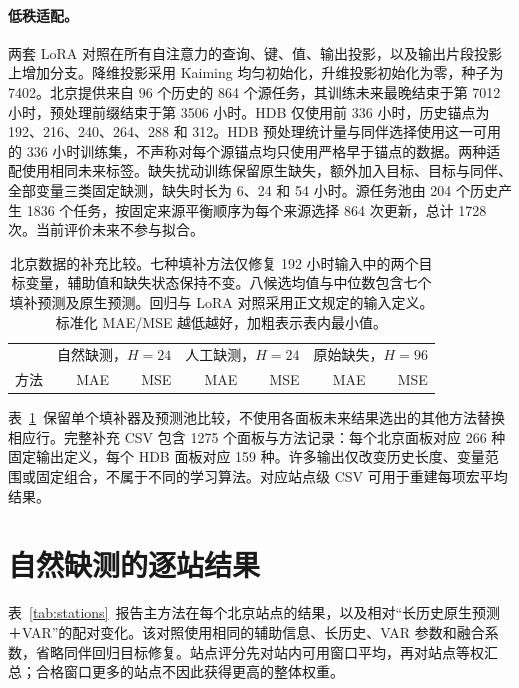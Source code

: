 \paragraph{低秩适配。}
两套 LoRA 对照在所有自注意力的查询、键、值、输出投影，以及输出片段投影上增加分支。降维投影采用 Kaiming 均匀初始化，升维投影初始化为零，种子为 7402。北京提供来自 96 个历史的 864 个源任务，其训练未来最晚结束于第 7012 小时，预处理前缀结束于第 3506 小时。HDB 仅使用前 336 小时，历史锚点为 192、216、240、264、288 和 312。HDB 预处理统计量与同伴选择使用这一可用的 336 小时训练集，不声称对每个源锚点均只使用严格早于锚点的数据。两种适配使用相同未来标签。缺失扰动训练保留原生缺失，额外加入目标、目标与同伴、全部变量三类固定缺测，缺失时长为 6、24 和 54 小时。源任务池由 204 个历史产生 1836 个任务，按固定来源平衡顺序为每个来源选择 864 次更新，总计 1728 次。当前评价未来不参与拟合。

\begin{table}[t]
\caption{北京数据的补充比较。七种填补方法仅修复 192 小时输入中的两个目标变量，辅助值和缺失状态保持不变。八候选均值与中位数包含七个填补预测及原生预测。回归与 LoRA 对照采用正文规定的输入定义。标准化 MAE/MSE 越低越好，加粗表示表内最小值。}
\label{tab:additional}
\centering\small
\setlength{\tabcolsep}{3.6pt}
\begin{tabular}{lrrrrrr}
\toprule
 & \multicolumn{2}{c}{自然缺测，$H=24$} & \multicolumn{2}{c}{人工缺测，$H=24$} & \multicolumn{2}{c}{原始缺失，$H=96$}\\
方法 & MAE & MSE & MAE & MSE & MAE & MSE\\
\midrule

\end{tabular}
\end{table}

表~\ref{tab:additional}~保留单个填补器及预测池比较，不使用各面板未来结果选出的其他方法替换相应行。完整补充 CSV 包含 1275 个面板与方法记录：每个北京面板对应 266 种固定输出定义，每个 HDB 面板对应 159 种。许多输出仅改变历史长度、变量范围或固定组合，不属于不同的学习算法。对应站点级 CSV 可用于重建每项宏平均结果。

\section{自然缺测的逐站结果}
\label{app:stations}

表~\ref{tab:stations}~报告主方法在每个北京站点的结果，以及相对“长历史原生预测＋VAR”的配对变化。该对照使用相同的辅助信息、长历史、VAR 参数和融合系数，省略同伴回归目标修复。站点评分先对站内可用窗口平均，再对站点等权汇总；合格窗口更多的站点不因此获得更高的整体权重。

